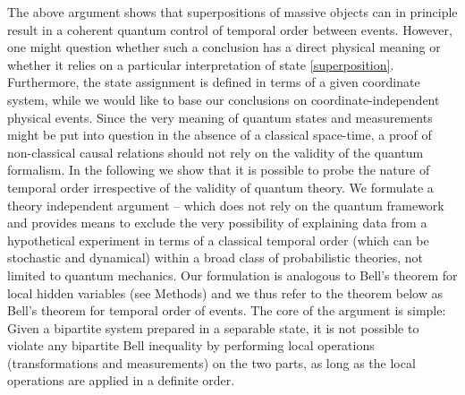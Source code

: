 \documentclass[a4paper,11pt]{article}
\begin{document}
The above argument shows that superpositions of massive objects can {in principle} result in a coherent quantum control of temporal order between events. However, one might question whether such a conclusion has a direct physical meaning or whether it relies on a particular interpretation of state \eqref{superposition}. Furthermore, the state assignment is defined in terms of a given coordinate system, while we would like to base our conclusions on coordinate-independent physical events. Since the very meaning of quantum states and measurements might be put into question in the absence of a classical space-time, a proof of non-classical causal relations should not rely on the validity of the quantum formalism.  In the following we show that it is possible to probe the nature of temporal order irrespective of the validity of quantum theory.  We formulate a theory independent argument -- which does not rely on the quantum framework and provides means to exclude the very possibility of explaining data from a hypothetical experiment in terms of a  classical temporal order (which can be stochastic and dynamical) within a broad class of probabilistic theories, not limited to quantum mechanics. %
Our formulation is analogous to  Bell's  theorem for local hidden variables \cite{bell64, Clauser1969} (see Methods) and we thus refer to the theorem below as Bell's theorem for temporal order of events. 
The core of the argument is simple: Given a bipartite system prepared in a separable state, it is not possible to violate any bipartite Bell inequality by performing local operations (transformations and measurements) on the two parts, as long as the local operations are applied in a definite order.

\end{document}

